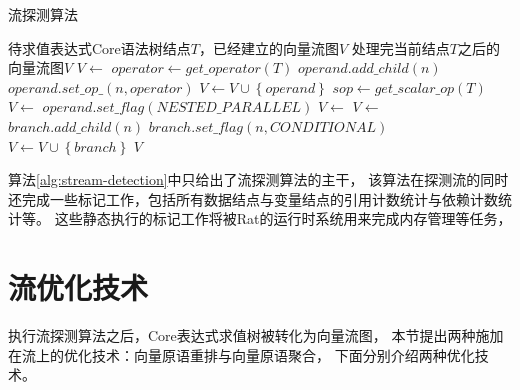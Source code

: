 \begin{algorithm}[htbp]
  \caption{流探测算法}
  \label{alg:stream-detection}
  \begin{algorithmic}[1]
    \Require 待求值表达式Core语法树结点$T$，已经建立的向量流图$V$
    \Ensure 处理完当前结点$T$之后的向量流图$V$
      \State $V \leftarrow$ 
      \State $operator \leftarrow get\_operator(T)$ %
      \State $operand.add\_child(n)$
      \State $operand.set\_op\_(n, operator)$
      \State $V \leftarrow V \cup \left\{ operand \right\}$
      \EndFor
      \State $sop \leftarrow get\_scalar\_op(T)$
      \State $V \leftarrow$ 
      \State $operand.set\_flag(NESTED\_PARALLEL)$
      \EndIf
      \EndIf
      \Else
      \State $V \leftarrow$ 
      \EndIf
      \State $V \leftarrow$ 
       {
        \State $branch.add\_child(n)$
        \State $branch.set\_flag(n, CONDITIONAL)$
        \State $V \leftarrow V \cup \left\{ branch \right\}$
        \EndIf
      }
      \EndFor
      \EndIf
      \State \Return $V$
    \EndFunction
  \end{algorithmic}
\end{algorithm}

算法\ref{alg:stream-detection}中只给出了流探测算法的主干，
该算法在探测流的同时还完成一些标记工作，包括所有数据结点与变量结点的引用计数统计与依赖计数统计等。
这些静态执行的标记工作将被Rat的运行时系统用来完成内存管理等任务，


\section{流优化技术}\label{sec:stream-optimization}
执行流探测算法之后，Core表达式求值树被转化为向量流图，
本节提出两种施加在流上的优化技术：向量原语重排与向量原语聚合，
下面分别介绍两种优化技术。

